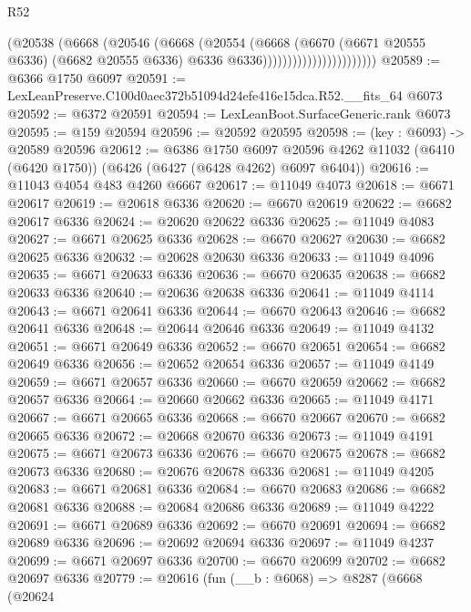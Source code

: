 \begin{lexlean}{R52}
\begin{coremodule}
                                    (@20538
                                      (@6668
                                        (@20546
                                          (@6668
                                            (@20554
                                              (@6668
                                                (@6670
                                                  (@6671 @20555 @6336)
                                                  (@6682 @20555 @6336)
                                                  @6336
                                                  @6336)))))))))))))))))))))))
@20589 := @6366 @1750 @6097
@20591 := LexLeanPreserve.C100d0aec372b51094d24efe416e15dca.R52.__fits_64 @6073
@20592 := @6372 @20591
@20594 := LexLeanBoot.SurfaceGeneric.rank @6073
@20595 := @159 @20594
@20596 := @20592 @20595
@20598 := (key : @6093) -> @20589 @20596
@20612 := @6386
    @1750
    @6097
    @20596
    @4262
    @11032
    (@6410 (@6420 @1750))
    (@6426 (@6427 (@6428 @4262) @6097 @6404))
@20616 := @11043 @4054 @483 @4260 @6667
@20617 := @11049 @4073
@20618 := @6671 @20617
@20619 := @20618 @6336
@20620 := @6670 @20619
@20622 := @6682 @20617 @6336
@20624 := @20620 @20622 @6336
@20625 := @11049 @4083
@20627 := @6671 @20625 @6336
@20628 := @6670 @20627
@20630 := @6682 @20625 @6336
@20632 := @20628 @20630 @6336
@20633 := @11049 @4096
@20635 := @6671 @20633 @6336
@20636 := @6670 @20635
@20638 := @6682 @20633 @6336
@20640 := @20636 @20638 @6336
@20641 := @11049 @4114
@20643 := @6671 @20641 @6336
@20644 := @6670 @20643
@20646 := @6682 @20641 @6336
@20648 := @20644 @20646 @6336
@20649 := @11049 @4132
@20651 := @6671 @20649 @6336
@20652 := @6670 @20651
@20654 := @6682 @20649 @6336
@20656 := @20652 @20654 @6336
@20657 := @11049 @4149
@20659 := @6671 @20657 @6336
@20660 := @6670 @20659
@20662 := @6682 @20657 @6336
@20664 := @20660 @20662 @6336
@20665 := @11049 @4171
@20667 := @6671 @20665 @6336
@20668 := @6670 @20667
@20670 := @6682 @20665 @6336
@20672 := @20668 @20670 @6336
@20673 := @11049 @4191
@20675 := @6671 @20673 @6336
@20676 := @6670 @20675
@20678 := @6682 @20673 @6336
@20680 := @20676 @20678 @6336
@20681 := @11049 @4205
@20683 := @6671 @20681 @6336
@20684 := @6670 @20683
@20686 := @6682 @20681 @6336
@20688 := @20684 @20686 @6336
@20689 := @11049 @4222
@20691 := @6671 @20689 @6336
@20692 := @6670 @20691
@20694 := @6682 @20689 @6336
@20696 := @20692 @20694 @6336
@20697 := @11049 @4237
@20699 := @6671 @20697 @6336
@20700 := @6670 @20699
@20702 := @6682 @20697 @6336
@20779 := @20616
    (fun (__b : @6068) =>
    @8287
      (@6668
        (@20624

\end{coremodule}
\end{lexlean}
